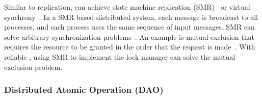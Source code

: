 


Similar to replication, \sys{} can achieve state machine replication (SMR)~\cite{lamport1978time} or virtual synchrony~\cite{birman1987exploiting}. In a SMR-based distributed system, each message is broadcast to all processes, and each process uses the same sequence of input messages.
SMR can solve arbitrary synchronization problems~\cite{lamport1978time}. An example is mutual exclusion that requires the resource to be granted in the order that the request is made~\cite{lamport1978time}.
With reliable \sys{}, using SMR to implement the lock manager can solve the mutual exclusion problem.


\subsubsection{Distributed Atomic Operation (DAO)}
\label{subsec:dao}

